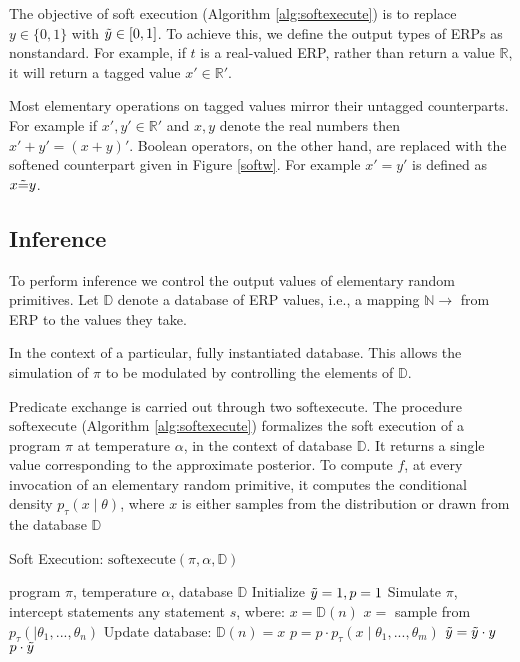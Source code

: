 The objective of soft execution (Algorithm \ref{alg:softexecute}) is to replace  $y \in \{0,1\}$ with $\tilde{y} \in [0, 1]$.
To achieve this, we define the output types of ERPs as nonstandard.
For example, if $t$ is a real-valued ERP, rather than return a value $\mathbb{R}$, it will return a tagged value $x' \in \mathbb{R}'$.

Most elementary operations on tagged values mirror their untagged counterparts.
For example if $x', y' \in \mathbb{R}'$ and $x, y$ denote the real numbers then $x'+ y' = (x + y)'$.
Boolean operators, on the other hand, are replaced with the softened counterpart given in Figure \ref{softw}.
For example $x' = y'$ is defined as $x \tilde{=} y$.


\subsection{Inference}

To perform inference we control the output values of elementary random primitives.
Let $\mathbb{D}$ denote a database of ERP values, i.e., a mapping $\mathbb{N } \to $ from ERP to the values they take. 

In the context of a particular, fully instantiated database.
This allows the simulation of $\pi$ to be modulated by controlling the elements of $\mathbb{D}$.

Predicate exchange is carried out through two $\textrm{softexecute}$.
The procedure $\textrm{softexecute}$ (Algorithm \ref{alg:softexecute}) formalizes the soft execution of a program $\pi$ at temperature $\alpha$, in the context of database $\mathbb{D}$.
It returns a single value corresponding to the approximate posterior.
To compute $f$, at every invocation of an elementary random primitive, it computes the conditional density $p_\tau(x \mid \theta)$, where $x$ is either samples from the distribution or drawn from the database $\mathbb{D}$

\begin{algorithm}[tb]
  \caption{Soft Execution: $\textrm{softexecute}(\pi, \alpha, \mathbb{D})$}
  \label{alg:softexecute}
\begin{algorithmic}
 program $\pi$, temperature $\alpha$, database $\mathbb{D}$
\STATE Initialize $\tilde{y} = 1, p = 1$
\STATE Simulate $\pi$, intercept statements any statement $s$, wbere:   
   \STATE $x = \mathbb{D}(n)$
 \ELSE
   \STATE $x = $ sample from $p_\tau(\mid \theta_1, ..., \theta_n)$
   \STATE Update database: $\mathbb{D}(n) = x$
 \ENDIF
 \STATE $p = p \cdot p_\tau(x \mid \theta_1, ..., \theta_m)$
   \STATE $\tilde{y} = \tilde{y} \cdot y$
 \ENDIF
{} $p \cdot \tilde{y}$
\end{algorithmic}
\end{algorithm}


